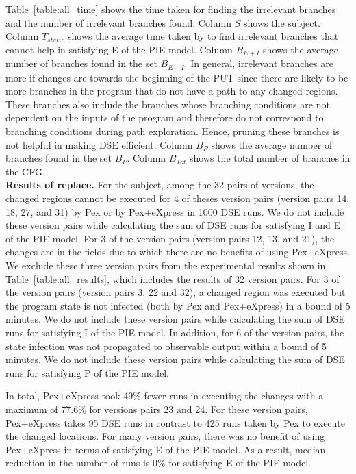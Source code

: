 Table~\ref{table:all_time} shows the time taken for finding the irrelevant branches and the number of irrelevant branches found. Column $S$ shows the subject. Column $T_{static}$ shows the average time taken by  to find irrelevant branches that cannot help in satisfying E of the PIE model. Column $B_{E+I}$ shows the 
average number of branches found in the set $B_{E+I}$. In general, irrelevant branches are more if changes are towards the beginning of the PUT since there are likely to be more branches in the program that do not have a path to any changed regions. These branches also include the branches whose branching conditions are not dependent on the inputs of the program and therefore do not correspond to branching conditions during path exploration. Hence, pruning these branches is not helpful in making DSE efficient. Column $B_{P}$ shows the 
average number of branches found in the set $B_{P}$.
Column $B_{Tot}$ shows the total number of branches in the CFG.
\\ \textbf{Results of replace. }For the  subject, among the 32 pairs of versions, the changed regions cannot be executed for 4 of theses version pairs (version pairs 14, 18, 27, and 31) by Pex or by Pex+eXpress in 1000 DSE runs. We do not include these version pairs while calculating the sum of DSE runs for satisfying I and E of the PIE model. For 3 of the version pairs (version pairs 12, 13, and 21), the changes are in the fields due to which there are no benefits of using Pex+eXpress. We exclude these three version pairs from the experimental results shown in Table~\ref{table:all_results}, which includes the results of 32 version pairs.
For 3 of the version pairs (version pairs 3, 22 and 32), a changed region was executed but the program state is not infected (both by Pex and Pex+eXpress)
in a bound of 5 minutes. We do not include these version pairs while calculating the sum of DSE runs for satisfying I of the PIE model. 
In addition, for 6 of the version pairs, the state infection was not propagated to observable output within a bound of 5 minutes.  We do not include these version pairs while calculating the sum of DSE runs for satisfying P of the PIE model. 

 
In total, Pex+eXpress took 49\% fewer runs in executing the changes with a maximum of 77.6\% for versions pairs 23 and 24. For these version pairs, Pex+eXpress takes 95 DSE runs in contrast to 425 runs taken by Pex to execute the changed locations. 
For many version pairs, there was no benefit of using Pex+eXpress in terms of satisfying E of the PIE model.
As a result, median reduction in the number of runs is 0\% for satisfying E of the PIE model.

